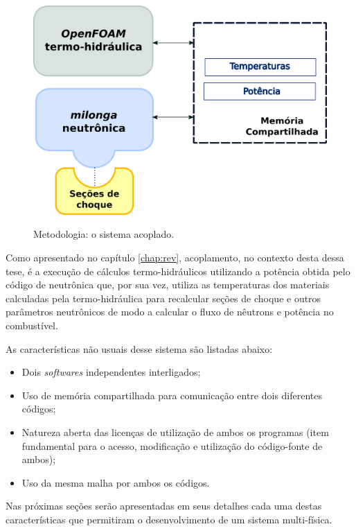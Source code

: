 \begin{figure}[htb]
  \caption{Metodologia: o sistema acoplado.}
  \centering\includegraphics[scale=0.6]{figuras/metodologia2.png}
  \label{metodoetapas}
\end{figure}

Como apresentado no capítulo \ref{chap:rev}, acoplamento, no contexto desta dessa tese, é a execução
de cálculos termo-hidráulicos utilizando a potência obtida pelo código de neutrônica que, por sua vez,
utiliza as temperaturas dos materiais calculadas pela termo-hidráulica para recalcular seções de choque
e outros parâmetros neutrônicos de modo a calcular o fluxo de nêutrons e potência no combustível.

As características não usuais desse sistema são listadas abaixo:

\begin{itemize}
\item Dois \textit{softwares} independentes interligados;
\item Uso de memória compartilhada para comunicação entre dois diferentes códigos;
\item Natureza aberta das licenças de utilização de ambos os programas (item fundamental para
  o acesso, modificação e utilização do código-fonte de ambos);
  \item Uso da mesma malha por ambos os códigos.
\end{itemize}

Nas próximas seções serão apresentadas em seus detalhes cada uma destas características que
permitiram o desenvolvimento de um sistema multi-física.

